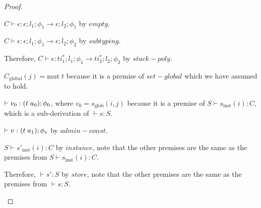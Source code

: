\begin{proof}
\begin{itemize}
        $C \vdash \epsilon : \epsilon;l_1;\phi_1 \rightarrow \epsilon;l_2;\phi_1$ by $empty$.

        $C \vdash \epsilon : \epsilon;l_1;\phi_1 \rightarrow \epsilon;l_2;\phi_2$ by $subtyping$.

        Therefore, $C \vdash \epsilon : ti_1^{*};l_1;\phi_1 \rightarrow ti_2^{*};l_2;\phi_2$ by $stack-poly$.

        $C_\text{global}(j) = \text{mut} \; t$ because it is a premise of $set-global$ which we have assumed to hold.

        $\vdash v_0 : (t\;a_0);\phi_0$, where $v_0 = s_\text{glob}(i,j)$ because it is a premise of $S \vdash s_\text{inst}(i) : C$, which is a sub-derivation of $\vdash s : S$.

        $\vdash v : (t\;a_1);\phi_v$ by $admin-const$.

        $S \vdash s'_\text{inst}(i) : C$ by $instance$, note that the other premises are the same as the premises from $S \vdash s_\text{inst}(i) : C$.


        Therefore, $\vdash s' : S$ by $store$, note that the other premises are the same as the premises from $\vdash s : S$.


\end{itemize}
\end{proof}
